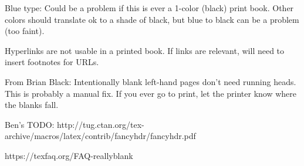 Blue type: Could be a problem if this is ever a 1-color (black) print book. Other colors should translate ok to a shade of black, but blue to black can be a problem (too faint).

Hyperlinks are not usable in a printed book. If links are relevant, will need to insert footnotes for URLs. 


From Brian Black:
Intentionally blank left-hand pages don’t need running heads. This is probably a manual fix. If you ever go to print, let the printer know where the blanks fall.

Ben's TODO:
http://tug.ctan.org/tex-archive/macros/latex/contrib/fancyhdr/fancyhdr.pdf

https://texfaq.org/FAQ-reallyblank